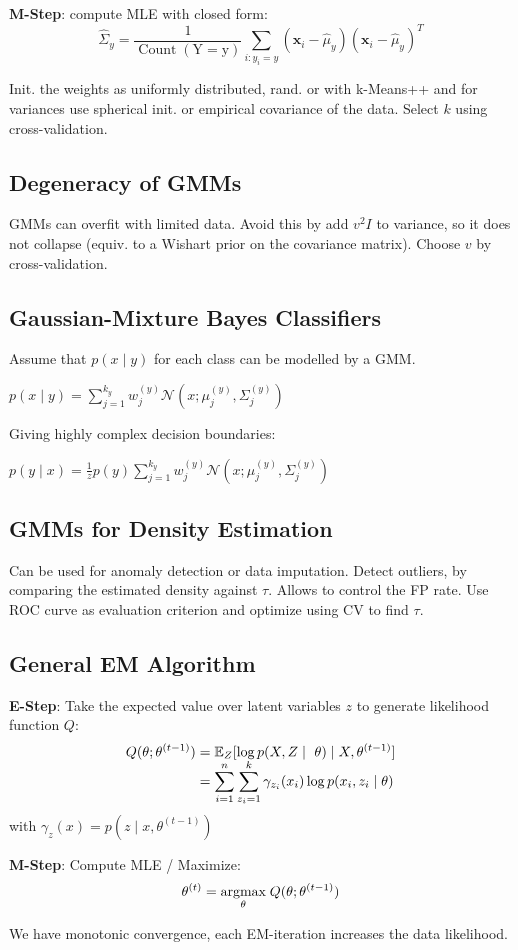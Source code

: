 \textbf{M-Step}: compute MLE with closed form:
\[
\hat{\Sigma}_y=\frac{1}{\operatorname{Count}(\mathrm{Y}=\mathrm{y})} \sum_{i: y_i=y}\left(\mathbf{x}_i-\hat{\mu}_y\right)\left(\mathbf{x}_i-\hat{\mu}_y\right)^T
\]

Init. the weights as uniformly distributed, rand. or with k-Means++ and for variances use spherical init. or empirical covariance of the data. Select $k$ using cross-validation.

\subsection*{Degeneracy of GMMs}

GMMs can overfit with limited data. Avoid this by add $v^2 I$ to variance, so it does not collapse (equiv. to a Wishart prior on the covariance matrix). Choose $v$ by cross-validation.

\subsection*{Gaussian-Mixture Bayes Classifiers}

Assume that $p(x \; | \; y)$ for each class can be modelled by a GMM.

\qquad $p(x \; | \; y) = \sum_{j=1}^{k_y} w_j^{(y)} \mathcal{N}(x; \mu_j^{(y)}, \Sigma_j^{(y)})$

Giving highly complex decision boundaries:

\qquad $p(y \; | \; x) = \frac{1}{z} p(y)  \sum_{j=1}^{k_y} w_j^{(y)} \mathcal{N}(x; \mu_j^{(y)}, \Sigma_j^{(y)})$

\subsection*{GMMs for Density Estimation}

Can be used for anomaly detection or data imputation. Detect outliers, by comparing the estimated density against $\tau$. Allows to control the FP rate. Use ROC curve as evaluation criterion and optimize using CV to find $\tau$.

\subsection*{General EM Algorithm}

\textbf{E-Step}: Take the expected value over latent variables $z$ to generate likelihood function $Q$:
\begin{align*}
	Q(\theta ; \theta^{(t-1)}) &= \E_{Z}[ \log  p(X, Z \; | \; \theta) \; | \; X, \theta^{(t-1)}] \\[-5pt]
	&= \sum_{i=1}^n \sum_{z_i=1}^k \gamma_{z_i}(x_i) \log p(x_i, z_i \; | \; \theta)
\end{align*}
with $\gamma_z(x) = p(z \; | \; x, \theta^{(t-1)})$

\textbf{M-Step}: Compute MLE / Maximize:
$$\theta^{(t)} = \underset{\theta}{\text{argmax}} \; Q(\theta; \theta^{(t-1)})$$

We have monotonic convergence, each EM-iteration increases the data likelihood.
